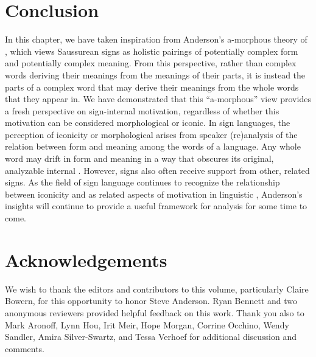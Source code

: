 \documentclass[output=paper,
modfonts
]{LSP/langsci}
\begin{document}
\section{Conclusion}

In this chapter, we have taken inspiration from Anderson's a-morphous theory of , which views Saussurean signs as holistic pairings of potentially complex form and potentially complex meaning. From this perspective, rather than complex words deriving their meanings from the meanings of their parts, it is instead the parts of a complex word that may derive their meanings from the whole words that they appear in. We have demonstrated that this ``a-morphous'' view provides a fresh perspective on sign-internal motivation, regardless of whether this motivation can be considered morphological or iconic. In sign languages, the perception of iconicity or morphological  arises from speaker (re)analysis of the relation between form and meaning among the words of a language. Any whole word may drift in form and meaning in a way that obscures its original, analyzable internal . However, signs also often receive  support from other, related signs. As the field of sign language  continues to recognize the relationship between iconicity and  as related aspects of motivation in linguistic , Anderson's insights will continue to provide a useful framework for analysis for some time to come.

\section*{Acknowledgements}
We wish to thank the editors and contributors to this volume, particularly Claire Bowern, for this opportunity to honor Steve Anderson. Ryan Bennett and two anonymous reviewers provided helpful feedback on this work. Thank you also to Mark Aronoff, Lynn Hou, Irit Meir, Hope Morgan, Corrine Occhino, Wendy Sandler, Amira Silver-Swartz, and Tessa Verhoef for additional discussion and comments.

{\sloppy
\printbibliography[heading=subbibliography,notkeyword=this]
}
\end{document}
